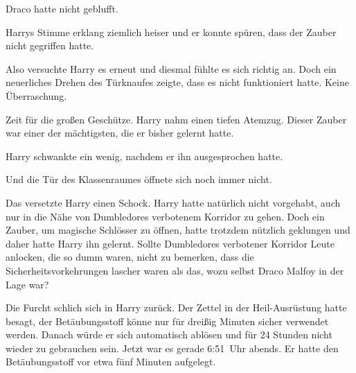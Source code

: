 Draco hatte nicht geblufft.

 Harrys Stimme erklang ziemlich heiser und er konnte spüren, dass der Zauber nicht gegriffen hatte.

Also versuchte Harry es erneut und diesmal fühlte es sich richtig an. Doch ein neuerliches Drehen des Türknaufes zeigte, dass es nicht funktioniert hatte. Keine Überraschung.

Zeit für die großen Geschütze. Harry nahm einen tiefen Atemzug. Dieser Zauber war einer der mächtigsten, die er bisher gelernt hatte.


Harry schwankte ein wenig, nachdem er ihn ausgesprochen hatte.

Und die Tür des Klassenraumes öffnete sich noch immer nicht.

Das versetzte Harry einen Schock. Harry hatte natürlich nicht vorgehabt, auch nur in die Nähe von Dumbledores verbotenem Korridor zu gehen. Doch ein Zauber, um magische Schlösser zu öffnen, hatte trotzdem nützlich geklungen und daher hatte Harry ihn gelernt. Sollte Dumbledores verbotener Korridor Leute anlocken, die so dumm waren, nicht zu bemerken, dass die Sicherheitsvorkehrungen lascher waren als das, wozu selbst Draco Malfoy in der Lage war?

Die Furcht schlich sich in Harry zurück. Der Zettel in der Heil-Ausrüstung hatte besagt, der Betäubungsstoff könne nur für dreißig Minuten sicher verwendet werden. Danach würde er sich automatisch ablösen und für 24 Stunden nicht wieder zu gebrauchen sein. Jetzt war es gerade 6:51~Uhr abends. Er hatte den Betäubungsstoff vor etwa fünf Minuten aufgelegt.

